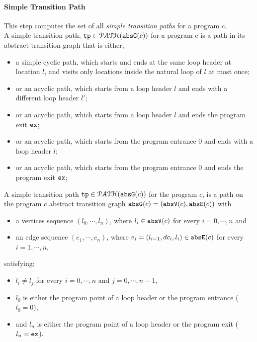 \paragraph{Simple Transition Path} This step computes the set of all \emph{simple transition paths} for a program $c$.
\\
%
A simple transition path, $\mathtt{tp} \in \mathcal{PATH}(\mathtt{abs}{\mathtt{G}}(c))$ for a program c is
a path in its abstract transition graph that is either,
\begin{itemize}
  \item a simple cyclic path, which starts and ends at the same loop header at location $l$, 
  and visits only locations inside the natural loop of $l$ at most once;
  \item or an acyclic path, which starts from a loop header $l$ 
and ends with a different loop header $l'$;
\item or an acyclic path, which starts from a loop header $l$ 
and ends the program exit $\mathtt{ex}$;
\item or an acyclic path, which starts from the program entrance $0$
and ends with a loop header $l$;
\item or an acyclic path, which starts from the program entrance $0$
and ends the program exit $\mathtt{ex}$;
\end{itemize}
  \begin{defn}
  A simple transition path
  $\mathtt{tp} \in \mathcal{PATH}(\mathtt{abs}{\mathtt{G}}(c))$ for the program $c$, is a path on the program $c$ abstract transition graph $\mathtt{abs}{\mathtt{G}}(c) = (\mathtt{abs}{\mathtt{V}}(c), \mathtt{abs}{\mathtt{E}}(c))$ with 
  \begin{itemize}
  \item a vertices sequence $(l_0, \cdots, l_n)$, where $l_i \in \mathtt{abs}{\mathtt{V}}(c)$ for every $i = 0, \cdots, n$ and
  \item an edge sequence $(e_1, \cdots, e_n)$, where $e_i = (l_{i - 1}, dc_i, l_{i}) \in \mathtt{abs}{\mathtt{E}}(c)$ for every $i = 1, \cdots, n$,
  \end{itemize}
  satisfying:
  \begin{itemize}
    \item $l_i \neq l_j$ for every $i = 0, \cdots, n$ and $j = 0, \cdots, {n - 1}$,
    \item $l_0$ is either the program point of a loop header or the program entrance ($l_0 = 0$),
    \item and $l_n$ is either the program point of a loop header or the program exit ($l_n = \mathtt{ex}$).
  \end{itemize}
  \end{defn}

